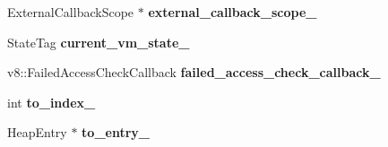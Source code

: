 \begin{DoxyCompactItemize}
\item 
External\+Callback\+Scope $\ast$ {\bfseries external\+\_\+callback\+\_\+scope\+\_\+}\hypertarget{classv8_1_1internal_1_1_b_a_s_e___e_m_b_e_d_d_e_d_a9bc372d58f59aa88ccfef6480f1594a3}{}\label{classv8_1_1internal_1_1_b_a_s_e___e_m_b_e_d_d_e_d_a9bc372d58f59aa88ccfef6480f1594a3}

\item 
State\+Tag {\bfseries current\+\_\+vm\+\_\+state\+\_\+}\hypertarget{classv8_1_1internal_1_1_b_a_s_e___e_m_b_e_d_d_e_d_a8d2930d8df71c46cbe59ccae120eb8ff}{}\label{classv8_1_1internal_1_1_b_a_s_e___e_m_b_e_d_d_e_d_a8d2930d8df71c46cbe59ccae120eb8ff}

\item 
v8\+::\+Failed\+Access\+Check\+Callback {\bfseries failed\+\_\+access\+\_\+check\+\_\+callback\+\_\+}\hypertarget{classv8_1_1internal_1_1_b_a_s_e___e_m_b_e_d_d_e_d_a436fcde032edba9c5b378c61d46ba498}{}\label{classv8_1_1internal_1_1_b_a_s_e___e_m_b_e_d_d_e_d_a436fcde032edba9c5b378c61d46ba498}

\item 
int {\bfseries to\+\_\+index\+\_\+}\hypertarget{classv8_1_1internal_1_1_b_a_s_e___e_m_b_e_d_d_e_d_a340997bbe7522384c02a1e4ef7c249ed}{}\label{classv8_1_1internal_1_1_b_a_s_e___e_m_b_e_d_d_e_d_a340997bbe7522384c02a1e4ef7c249ed}

\item 
Heap\+Entry $\ast$ {\bfseries to\+\_\+entry\+\_\+}\hypertarget{classv8_1_1internal_1_1_b_a_s_e___e_m_b_e_d_d_e_d_a2d74690305d1db631caf0d0eb59fb766}{}\label{classv8_1_1internal_1_1_b_a_s_e___e_m_b_e_d_d_e_d_a2d74690305d1db631caf0d0eb59fb766}

\end{DoxyCompactItemize}

